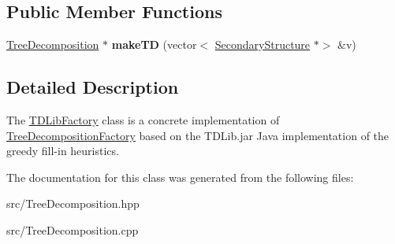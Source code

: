 \subsection*{Public Member Functions}
\begin{DoxyCompactItemize}
\item 
\mbox{\label{class_t_d_lib_factory_a7d8ce8a88978b4d5eca8bfd81a7ec030}} 
\hyperlink{class_tree_decomposition}{Tree\+Decomposition} $\ast$ {\bfseries make\+TD} (vector$<$ \hyperlink{class_secondary_structure}{Secondary\+Structure} $\ast$$>$ \&v)
\end{DoxyCompactItemize}


\subsection{Detailed Description}
The \hyperlink{class_t_d_lib_factory}{T\+D\+Lib\+Factory} class is a concrete implementation of \hyperlink{class_tree_decomposition_factory}{Tree\+Decomposition\+Factory} based on the T\+D\+Lib.\+jar Java implementation of the greedy fill-\/in heuristics. 

The documentation for this class was generated from the following files\+:\begin{DoxyCompactItemize}
\item 
src/Tree\+Decomposition.\+hpp\item 
src/Tree\+Decomposition.\+cpp\end{DoxyCompactItemize}

